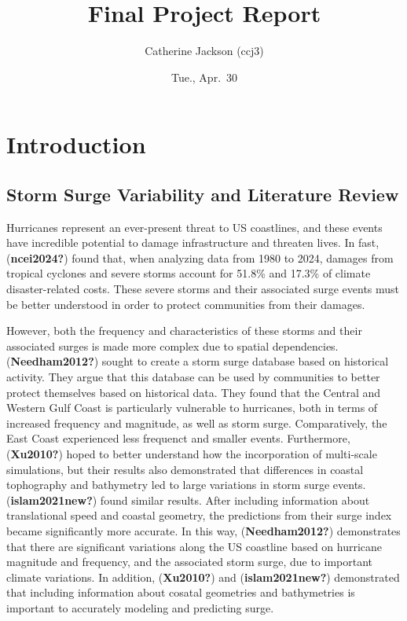\documentclass[
  11pt,
]{article}
\title{Final Project Report}
\author{Catherine Jackson (ccj3)}
\date{Tue., Apr.~30}
\begin{document}
\maketitle
\ifdefined\Shaded\renewenvironment{Shaded}{\begin{tcolorbox}[interior hidden, sharp corners, borderline west={3pt}{0pt}{shadecolor}, enhanced, frame hidden, breakable, boxrule=0pt]}{\end{tcolorbox}}\fi

\hypertarget{introduction}{%
\section{Introduction}\label{introduction}}

\hypertarget{storm-surge-variability-and-literature-review}{%
\subsection{Storm Surge Variability and Literature
Review}\label{storm-surge-variability-and-literature-review}}

Hurricanes represent an ever-present threat to US coastlines, and these
events have incredible potential to damage infrastructure and threaten
lives. In fast, (\textbf{ncei2024?}) found that, when analyzing data
from 1980 to 2024, damages from tropical cyclones and severe storms
account for 51.8\% and 17.3\% of climate disaster-related costs. These
severe storms and their associated surge events must be better
understood in order to protect communities from their damages.

However, both the frequency and characteristics of these storms and
their associated surges is made more complex due to spatial
dependencies. (\textbf{Needham2012?}) sought to create a storm surge
database based on historical activity. They argue that this database can
be used by communities to better protect themselves based on historical
data. They found that the Central and Western Gulf Coast is particularly
vulnerable to hurricanes, both in terms of increased frequency and
magnitude, as well as storm surge. Comparatively, the East Coast
experienced less frequenct and smaller events. Furthermore,
(\textbf{Xu2010?}) hoped to better understand how the incorporation of
multi-scale simulations, but their results also demonstrated that
differences in coastal tophography and bathymetry led to large
variations in storm surge events. (\textbf{islam2021new?}) found similar
results. After including information about translational speed and
coastal geometry, the predictions from their surge index became
significantly more accurate. In this way, (\textbf{Needham2012?})
demonstrates that there are significant variations along the US
coastline based on hurricane magnitude and frequency, and the associated
storm surge, due to important climate variations. In addition,
(\textbf{Xu2010?}) and (\textbf{islam2021new?}) demonstrated that
including information about cosatal geometries and bathymetries is
important to accurately modeling and predicting surge.
\end{document}
